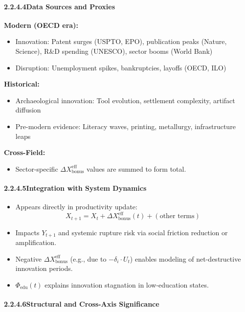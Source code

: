 \documentclass[12pt]{report}
\begin{document}
\paragraph{2.2.4.4\quad Data Sources and Proxies}

\textbf{Modern (OECD era):}
\begin{itemize}
  \item Innovation: Patent surges (USPTO, EPO), publication peaks (Nature, Science), R\&D spending (UNESCO), sector booms (World Bank)
  \item Disruption: Unemployment spikes, bankruptcies, layoffs (OECD, ILO)
\end{itemize}

\textbf{Historical:}
\begin{itemize}
  \item Archaeological innovation: Tool evolution, settlement complexity, artifact diffusion
  \item Pre-modern evidence: Literacy waves, printing, metallurgy, infrastructure leaps
\end{itemize}

\textbf{Cross-Field:}
\begin{itemize}
  \item Sector-specific $\Delta X_{\text{bonus}}^{\text{eff}}$ values are summed to form total.
\end{itemize}

\paragraph{2.2.4.5\quad Integration with System Dynamics}

\begin{itemize}
  \item Appears directly in productivity update:
  \[
  X_{t+1} = X_t + \Delta X_{\text{bonus}}^{\text{eff}}(t) + (\text{other terms})
  \]
  \item Impacts $Y_{t+1}$ and systemic rupture risk via social friction reduction or amplification.
  \item Negative $\Delta X_{\text{bonus}}^{\text{eff}}$ (e.g., due to $- \delta_i \cdot U_t$) enables modeling of net-destructive innovation periods.
  \item $\Phi_{\text{edu}}(t)$ explains innovation stagnation in low-education states.
\end{itemize}

\paragraph{2.2.4.6\quad Structural and Cross-Axis Significance}
\end{document}
